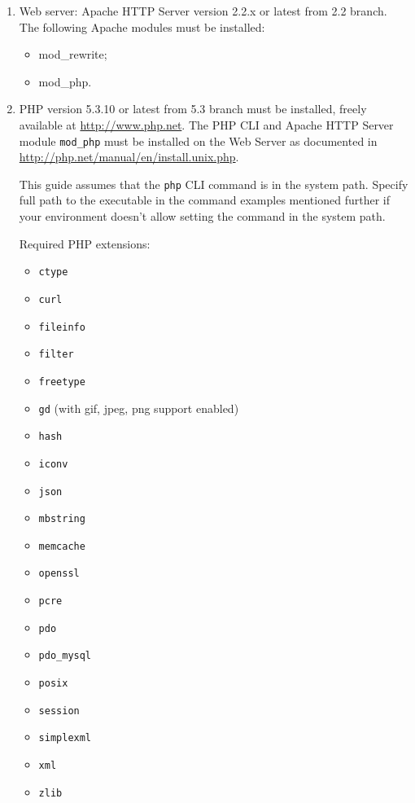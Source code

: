 \documentclass[12pt]{article}
\begin{document}
\begin{enumerate}

\item 
Web server: Apache HTTP Server version 2.2.x or latest from 2.2 branch. The following Apache modules must be installed:
\begin{itemize}
	\item mod\_rewrite;
	\item mod\_php.
\end{itemize}

\item 
PHP version 5.3.10 or latest from 5.3 branch must be installed, freely available at \url{http://www.php.net}. The PHP CLI and Apache HTTP Server module \texttt{mod\_php} must be installed on the Web Server as documented in \url{http://php.net/manual/en/install.unix.php}.

This guide assumes that the \texttt{php} CLI command is in the system path. Specify full path to the executable in the command examples mentioned further if your environment doesn't allow setting the command in the system path.

Required PHP extensions:

\begin{itemize}
\item  \texttt{ctype}
\item  \texttt{curl}
\item  \texttt{fileinfo}
\item  \texttt{filter}
\item  \texttt{freetype}
\item  \texttt{gd} (with gif, jpeg, png support enabled)
\item  \texttt{hash}
\item  \texttt{iconv}
\item  \texttt{json}
\item  \texttt{mbstring}
\item  \texttt{memcache}
\item  \texttt{openssl}
\item  \texttt{pcre}
\item  \texttt{pdo}
\item  \texttt{pdo\_mysql}
\item  \texttt{posix}
\item  \texttt{session}
\item  \texttt{simplexml}
\item  \texttt{xml}
\item  \texttt{zlib}
\end{itemize}


\end{enumerate}
\end{document}
